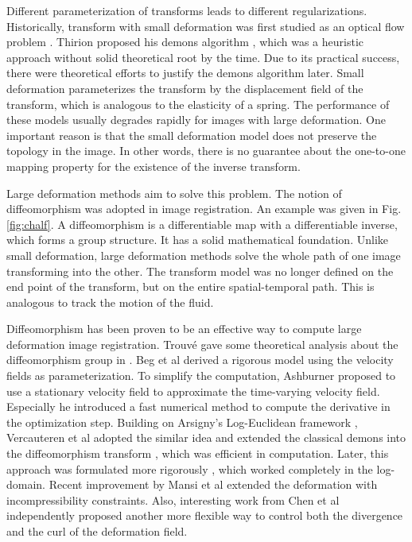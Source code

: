 \documentclass[letterpaper,12pt]{article}
\begin{document}
Different parameterization of transforms leads to different regularizations. Historically, transform with small deformation was first studied as an optical flow problem \cite{Horn1981}. Thirion proposed his demons algorithm \cite{Thirion98}, which was a heuristic approach without solid theoretical root by the time. Due to its practical success, there were theoretical efforts \cite{Cachier2003} to justify the demons algorithm later. Small deformation parameterizes the transform by the displacement field of the transform, which is analogous to the elasticity of a spring. The performance of these models usually degrades rapidly for images with large deformation. One important reason is that the small deformation model does not preserve the topology in the image. In other words, there is no guarantee about the one-to-one mapping property for the existence of the inverse transform.

Large deformation methods aim to solve this problem. The notion of diffeomorphism was adopted in image registration. An example was given in Fig. \ref{fig:chalf}. A diffeomorphism is a differentiable map with a differentiable
inverse, which forms a group structure. It has a solid mathematical foundation. Unlike small deformation, large deformation methods solve the whole path of one image transforming into the other. The transform model was no longer defined on the end point of the transform, but on the entire spatial-temporal path. This is analogous to track the motion of the fluid. 


Diffeomorphism has been proven to be an effective way to compute large deformation image registration. 
Trouv\'{e} gave some theoretical analysis about the diffeomorphism group in \cite{Trouve1998}. Beg et al derived a rigorous model \cite{Beg2005Computing} using the velocity fields as parameterization. To simplify the computation, Ashburner \cite{Ashburner2007} proposed to use a stationary velocity field to approximate the time-varying velocity field. Especially he introduced a fast numerical method to compute the derivative in the optimization step. Building on Arsigny's Log-Euclidean framework \cite{Arsigny2006}, Vercauteren et al adopted the similar idea and extended the classical demons into the diffeomorphism transform \cite{Vercauteren2009}, which was efficient in computation. Later, this approach was formulated more rigorously \cite{Vercauteren2008Symmetric}, which worked completely in the log-domain. Recent improvement by Mansi et al \cite{Mansi2010} extended the deformation with incompressibility constraints. Also, interesting work \cite{Chen2010} from Chen et al independently proposed another more flexible way to control both the divergence and the curl of the deformation field.
\end{document}

